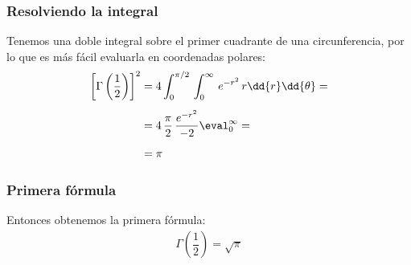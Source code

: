 \begin{frame}
\frametitle{Resolviendo la integral}
Tenemos una doble integral sobre el primer cuadrante de una circunferencia, por lo que es más fácil evaluarla en coordenadas polares:
\begin{align*}
\left[ \Gamma \left( \dfrac{1}{2} \right) \right]^{2} &= 4 \int_{0}^{\pi/2} \, \int_{0}^{\infty} \, e^{-r^{2}} \, r \dd{r} \dd{\theta} = \\[0.5em]
&= 4 \, \dfrac{\pi}{2} \, \dfrac{e^{-r^{2}}}{-2}\eval_{0}^{\infty} = \\[0.5em]
&= \pi
\end{align*}
\end{frame}
\begin{frame}
\frametitle{Primera fórmula}
Entonces obtenemos la primera fórmula:
\begin{align}
\boxed{\Gamma \left( \dfrac{1}{2} \right) = \sqrt{\pi}}
\label{eq:ecuacion_05_03}
\end{align}
\end{frame}
